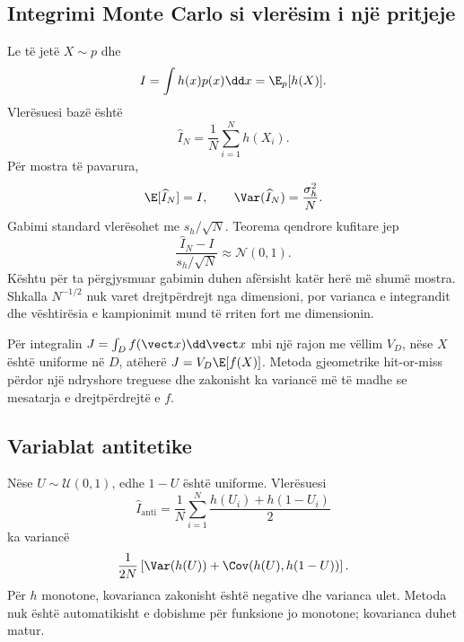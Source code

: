 \subsection{Integrimi Monte Carlo si vlerësim i një pritjeje}
Le të jetë $X\sim p$ dhe
\begin{equation}
 I=\int h(x)p(x)\dd x=\E_p[h(X)].
\end{equation}
Vlerësuesi bazë është
\begin{equation}
 \widehat I_N=\frac1N\sum_{i=1}^{N}h(X_i).
\end{equation}
Për mostra të pavarura,
\begin{equation}
 \E[\widehat I_N]=I,
 \qquad
 \Var(\widehat I_N)=\frac{\sigma_h^2}{N}.
\end{equation}
Gabimi standard vlerësohet me $s_h/\sqrt N$. Teorema qendrore kufitare jep
\begin{equation}
 \frac{\widehat I_N-I}{s_h/\sqrt N}\approx\mathcal N(0,1).
\end{equation}
Kështu për ta përgjysmuar gabimin duhen afërsisht katër herë më shumë mostra. Shkalla $N^{-1/2}$ nuk varet drejtpërdrejt nga dimensioni, por varianca e integrandit dhe vështirësia e kampionimit mund të rriten fort me dimensionin.

Për integralin $J=\int_D f(\vect x)\dd\vect x$ mbi një rajon me vëllim $V_D$, nëse $X$ është uniforme në $D$, atëherë $J=V_D\E[f(X)]$. Metoda gjeometrike hit-or-miss përdor një ndryshore treguese dhe zakonisht ka variancë më të madhe se mesatarja e drejtpërdrejtë e $f$.

\subsection{Variablat antitetike}
Nëse $U\sim\mathcal U(0,1)$, edhe $1-U$ është uniforme. Vlerësuesi
\begin{equation}
 \widehat I_{\mathrm{anti}}=\frac1N\sum_{i=1}^{N}
 \frac{h(U_i)+h(1-U_i)}{2}
\end{equation}
ka variancë
\begin{equation}
 \frac{1}{2N}\left[\Var(h(U))+\Cov(h(U),h(1-U))\right].
\end{equation}
Për $h$ monotone, kovarianca zakonisht është negative dhe varianca ulet. Metoda nuk është automatikisht e dobishme për funksione jo monotone; kovarianca duhet matur.

